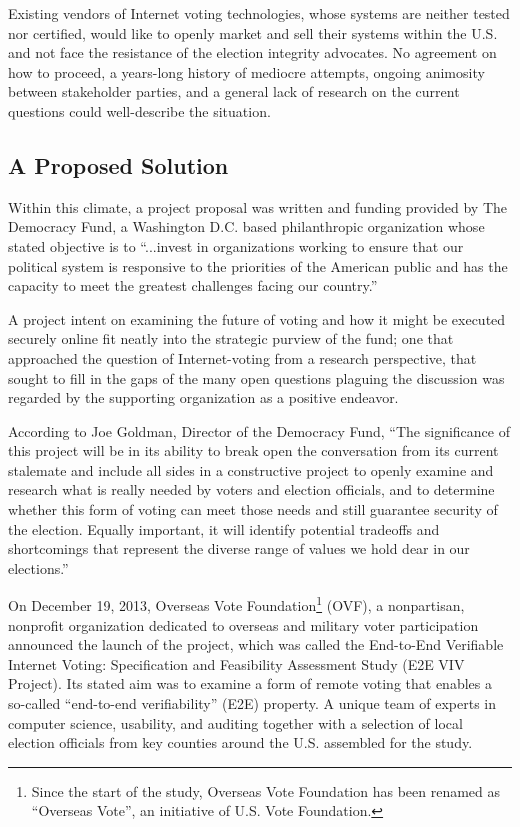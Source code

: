 Existing vendors of Internet voting technologies, whose systems are
neither tested nor certified, would like to openly market and sell
their systems within the U.S. and not face the resistance of the
election integrity advocates. No agreement on how to proceed, a
years-long history of mediocre attempts, ongoing animosity between
stakeholder parties, and a general lack of research on the current
questions could well-describe the situation.

\subsection{A Proposed Solution}
\label{sec:proposed-solution}

Within this climate, a project proposal was written and funding
provided by The Democracy Fund, a Washington D.C. based philanthropic
organization whose stated objective is to “...invest in organizations
working to ensure that our political system is responsive to the
priorities of the American public and has the capacity to meet the
greatest challenges facing our country.” 

A project intent on examining the future of voting and how it might be
executed securely online fit neatly into the strategic purview of the
fund; one that approached the question of Internet-voting from a
research perspective, that sought to fill in the gaps of the many open
questions plaguing the discussion was regarded by the supporting
organization as a positive endeavor. 

According to Joe Goldman, Director of the Democracy Fund, “The
significance of this project will be in its ability to break open the
conversation from its current stalemate and include all sides in a
constructive project to openly examine and research what is really
needed by voters and election officials, and to determine whether this
form of voting can meet those needs and still guarantee security of
the election. Equally important, it will identify potential tradeoffs
and shortcomings that represent the diverse range of values we hold
dear in our elections.”

On December 19, 2013, Overseas Vote Foundation\footnote{Since the
  start of the study, Overseas Vote Foundation has been renamed as
  “Overseas Vote”, an initiative of U.S. Vote Foundation.} (OVF), a
nonpartisan, nonprofit organization dedicated to overseas and military
voter participation announced the launch of the project, which was
called the End-to-End Verifiable Internet Voting: Specification and
Feasibility Assessment Study (E2E VIV Project). Its stated aim was to
examine a form of remote voting that enables a so-called “end-to-end
verifiability” (E2E) property. A unique team of experts in computer
science, usability, and auditing together with a selection of local
election officials from key counties around the U.S. assembled for the
study.

